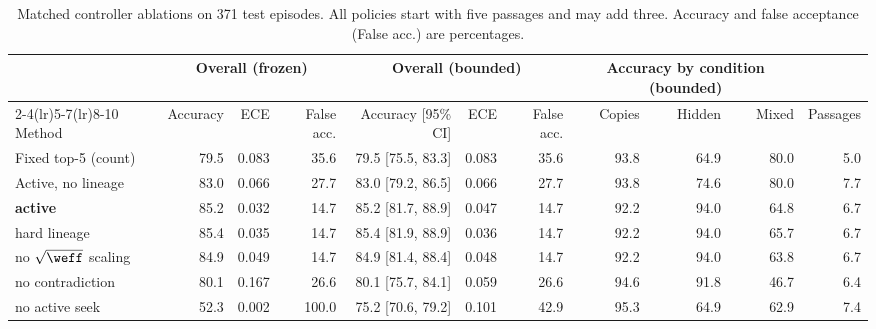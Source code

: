 \begin{table}[t]
\centering\footnotesize\setlength{\tabcolsep}{3.6pt}
\caption{Matched controller ablations on 371 test episodes. All policies start with five passages and may add three. Accuracy and false acceptance (False acc.) are percentages.}
\label{tab:ablation}
\begin{tabular}{l rrr rrr rrr r}
\toprule
& \multicolumn{3}{c}{Overall (frozen)} & \multicolumn{3}{c}{Overall (bounded)} & \multicolumn{3}{c}{Accuracy by condition (bounded)} & \\
\cmidrule(lr){2-4}\cmidrule(lr){5-7}\cmidrule(lr){8-10}
Method & Accuracy & ECE & False acc. & Accuracy [95\% CI] & ECE & False acc. & Copies & Hidden & Mixed & Passages \\
\midrule
Fixed top-5 (count) & 79.5 & 0.083 & 35.6 & 79.5 [75.5, 83.3] & 0.083 & 35.6 & 93.8 & 64.9 & 80.0 & 5.0 \\
Active, no lineage & 83.0 & 0.066 & 27.7 & 83.0 [79.2, 86.5] & 0.066 & 27.7 & 93.8 & 74.6 & 80.0 & 7.7 \\
\textbf{\system{} active} & 85.2 & 0.032 & 14.7 & 85.2 [81.7, 88.9] & 0.047 & 14.7 & 92.2 & 94.0 & 64.8 & 6.7 \\
\quad hard lineage & 85.4 & 0.035 & 14.7 & 85.4 [81.9, 88.9] & 0.036 & 14.7 & 92.2 & 94.0 & 65.7 & 6.7 \\
\quad no $\sqrt{\weff}$ scaling & 84.9 & 0.049 & 14.7 & 84.9 [81.4, 88.4] & 0.048 & 14.7 & 92.2 & 94.0 & 63.8 & 6.7 \\
\quad no contradiction & 80.1 & 0.167 & 26.6 & 80.1 [75.7, 84.1] & 0.059 & 26.6 & 94.6 & 91.8 & 46.7 & 6.4 \\
\quad no active seek & 52.3 & 0.002 & 100.0 & 75.2 [70.6, 79.2] & 0.101 & 42.9 & 95.3 & 64.9 & 62.9 & 7.4 \\
\bottomrule
\end{tabular}
\end{table}
